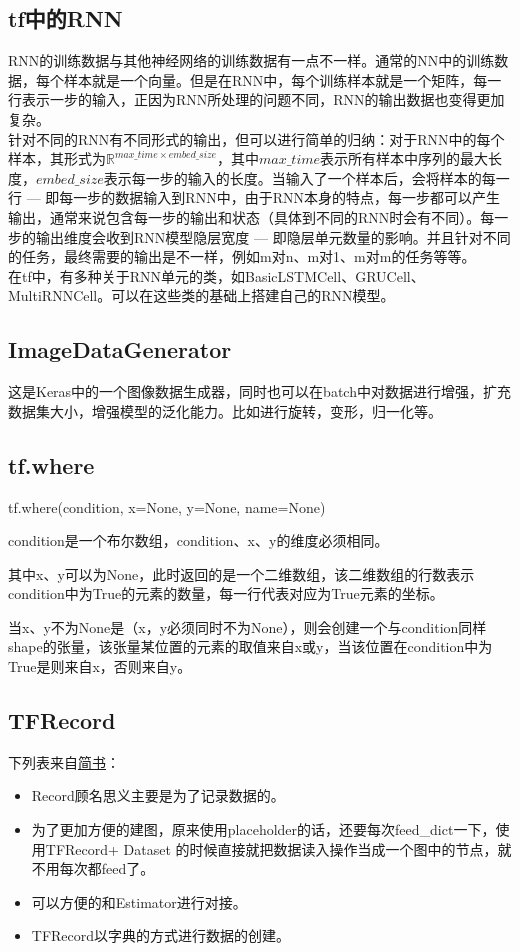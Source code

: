 \subsection{tf中的RNN}RNN的训练数据与其他神经网络的训练数据有一点不一样。通常的NN中的训练数据，每个样本就是一个向量。但是在RNN中，每个训练样本就是一个矩阵，每一行表示一步的输入，正因为RNN所处理的问题不同，RNN的输出数据也变得更加复杂。\\
针对不同的RNN有不同形式的输出，但可以进行简单的归纳：对于RNN中的每个样本，其形式为$\mathbb{R}^{max\_time \times embed\_size}$，其中$max\_time$表示所有样本中序列的最大长度，$embed\_size$表示每一步的输入的长度。当输入了一个样本后，会将样本的每一行 --- 即每一步的数据输入到RNN中，由于RNN本身的特点，每一步都可以产生输出，通常来说包含每一步的输出和状态（具体到不同的RNN时会有不同）。每一步的输出维度会收到RNN模型隐层宽度 --- 即隐层单元数量的影响。并且针对不同的任务，最终需要的输出是不一样，例如m对n、m对1、m对m的任务等等。\\
在tf中，有多种关于RNN单元的类，如BasicLSTMCell、GRUCell、MultiRNNCell。可以在这些类的基础上搭建自己的RNN模型。


\subsection{ImageDataGenerator}
这是Keras中的一个图像数据生成器，同时也可以在batch中对数据进行增强，扩充数据集大小，增强模型的泛化能力。比如进行旋转，变形，归一化等。

\subsection{tf.where}
tf.where(condition, x=None, y=None, name=None)

condition是一个布尔数组，condition、x、y的维度必须相同。

其中x、y可以为None，此时返回的是一个二维数组，该二维数组的行数表示condition中为True的元素的数量，每一行代表对应为True元素的坐标。

当x、y不为None是（x，y必须同时不为None），则会创建一个与condition同样shape的张量，该张量某位置的元素的取值来自x或y，当该位置在condition中为True是则来自x，否则来自y。


\subsection{TFRecord}
下列表来自\href{https://www.jianshu.com/p/72596a8488c3}{简书}：
\begin{itemize}
	\item Record顾名思义主要是为了记录数据的。
	\item 为了更加方便的建图，原来使用placeholder的话，还要每次feed\_dict一下，使用TFRecord+ Dataset 的时候直接就把数据读入操作当成一个图中的节点，就不用每次都feed了。
	\item 可以方便的和Estimator进行对接。
	\item TFRecord以字典的方式进行数据的创建。
\end{itemize}

